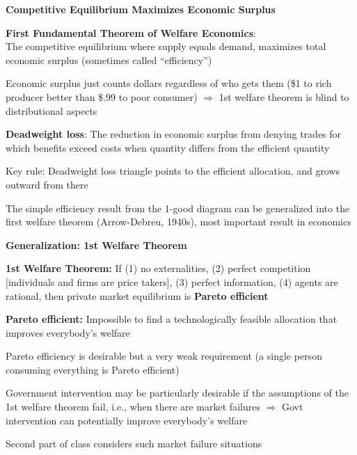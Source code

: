 \documentclass[landscape]{slides}
\begin{document}
\begin{slide}
\begin{center}
{\bf Competitive Equilibrium Maximizes Economic Surplus}
\end{center}

{\bf First Fundamental Theorem of Welfare Economics}:\\
The
competitive equilibrium where
supply equals demand, maximizes
total economic surplus (sometimes called ``efficiency'')

Economic surplus just counts dollars regardless of who gets them
(\$1 to rich producer better than \$.99 to poor consumer) $\Rightarrow$
1st welfare theorem is blind to distributional aspects

{\bf Deadweight loss}:
The reduction in economic surplus from denying
trades for which benefits
exceed costs when quantity differs from the efficient quantity

Key rule: Deadweight loss triangle points to the efficient allocation, and grows outward from there

The simple efficiency result from the 1-good diagram can be generalized into
the first welfare theorem (Arrow-Debreu, 1940s), most important result in economics

\end{slide}


\begin{slide}

\end{slide}

\begin{slide}
\begin{center}
{\bf Generalization: 1st Welfare Theorem}
\end{center}

{\bf 1st Welfare Theorem:} If (1) no externalities, (2) perfect
competition [individuals and firms are price takers], (3) perfect information, (4) agents are rational,
then private market equilibrium is \textbf{Pareto efficient}

\textbf{Pareto efficient:} Impossible to find a technologically feasible allocation that improves
everybody's welfare

Pareto efficiency is desirable but a very weak requirement (a single
person consuming everything is Pareto efficient)

Government intervention may be particularly desirable if the assumptions of
the 1st welfare theorem fail, i.e., when there are market failures $\Rightarrow$
Govt intervention can potentially improve everybody's welfare

Second part of class considers such market failure situations

\end{slide}
\end{document}

